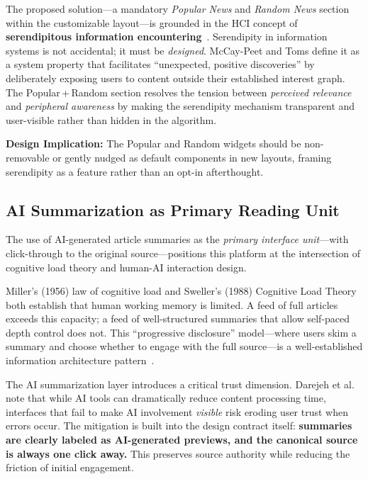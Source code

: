 \documentclass[14pt]{article}
\begin{document}
The proposed solution---a mandatory \emph{Popular News} and \emph{Random News} section within the customizable layout---is grounded in the HCI concept of \textbf{serendipitous information encountering}~\cite{mccaypeet2015}. Serendipity in information systems is not accidental; it must be \emph{designed}. McCay-Peet and Toms define it as a system property that facilitates ``unexpected, positive discoveries'' by deliberately exposing users to content outside their established interest graph. The Popular\,+\,Random section resolves the tension between \emph{perceived relevance} and \emph{peripheral awareness} by making the serendipity mechanism transparent and user-visible rather than hidden in the algorithm.

\smallskip
\noindent\textbf{Design Implication:} The Popular and Random widgets should be non-removable or gently nudged as default components in new layouts, framing serendipity as a feature rather than an opt-in afterthought.

\subsection{AI Summarization as Primary Reading Unit}
\label{sec:aisum}

The use of AI-generated article summaries as the \emph{primary interface unit}---with click-through to the original source---positions this platform at the intersection of cognitive load theory and human-AI interaction design.

Miller's (1956) law of cognitive load and Sweller's (1988) Cognitive Load Theory both establish that human working memory is limited. A feed of full articles exceeds this capacity; a feed of well-structured summaries that allow self-paced depth control does not. This ``progressive disclosure'' model---where users skim a summary and choose whether to engage with the full source---is a well-established information architecture pattern~\cite{nielsen2006}.

The AI summarization layer introduces a critical trust dimension. Darejeh et al.~\cite{darejeh2024} note that while AI tools can dramatically reduce content processing time, interfaces that fail to make AI involvement \emph{visible} risk eroding user trust when errors occur. The mitigation is built into the design contract itself: \textbf{summaries are clearly labeled as AI-generated previews, and the canonical source is always one click away.} This preserves source authority while reducing the friction of initial engagement.
\end{document}
